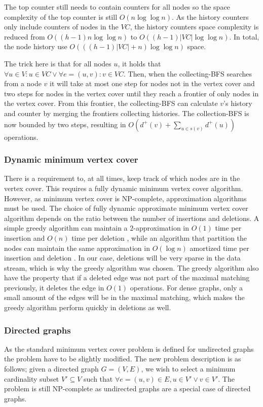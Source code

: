 The top counter still needs to contain counters for all nodes so the space complexity of the top counter is still $O(n\log \log n)$. As the history counters only include counters of nodes in the $VC$, the history counters space complexity is reduced from $O((h-1)n \log \log n)$ to $O((h-1)|VC| \log \log n)$. In total, the node history use $O(((h-1)|VC| + n )\log \log n)$ space.

The trick here is that for all nodes $u$, it holds that $\forall u \in V: u \in VC \vee \forall e = (u,v) : v \in VC$. Then, when the collecting-BFS searches from a node $v$ it will take at most one step for nodes not in the vertex cover and two steps for nodes in the vertex cover until they reach a frontier of only nodes in the vertex cover. From this frontier, the collecting-BFS can calculate $v$'s history and counter by merging the frontiers collecting histories. The collection-BFS is now bounded by two steps, resulting in $O(d^+(v) + \sum_{u \in s(v)}{d^+(u)})$ operations.

\subsubsection{Dynamic minimum vertex cover}
There is a requirement to, at all times, keep track of which nodes are in the vertex cover. This requires a fully dynamic minimum vertex cover algorithm. However, as minimum vertex cover is NP-complete, approximation algorithms must be used. The choice of fully dynamic approximate minimum vertex cover algorithm depends on the ratio between the number of insertions and deletions. A simple greedy algorithm can maintain a $2$-approximation in $O(1)$ time per insertion and $O(n)$ time per deletion \cite{2appdynvc}, while an algorithm that partition the nodes can maintain the same approximation in $O(\log n )$ amortized time per insertion and deletion \cite{2appdynvclogn}. In our case, deletions will be very sparse in the data stream, which is why the greedy algorithm was chosen. The greedy algorithm also have the property that if a deleted edge was not part of the maximal matching previously, it deletes the edge in $O(1)$ operations. For dense graphs, only a small amount of the edges will be in the maximal matching, which makes the greedy algorithm perform quickly in deletions as well. 

 
\subsubsection{Directed graphs}
As the standard minimum vertex cover problem is defined for undirected graphs the problem have to be slightly modified. The new problem description is as follows; given a directed graph $G = (V,E)$, we wish to select a minimum cardinality subset $V' \subseteq V$ such that $\forall e = (u,v) \in E, u \in V' \vee v \in V'$. The problem is still NP-complete as undirected graphs are a special case of directed graphs. 

